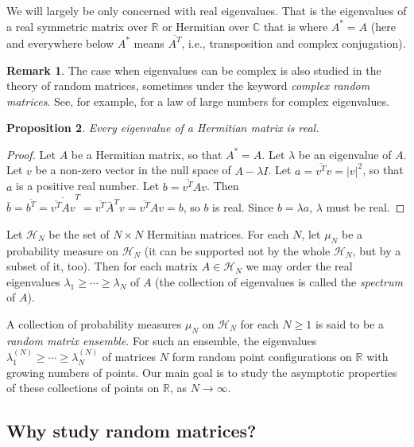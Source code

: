 \documentclass[letterpaper,11pt,oneside,reqno]{amsart}
\numberwithin{equation}{section}
\newtheorem{proposition}{Proposition}[section]
\theoremstyle{definition}
\newtheorem{remark}[proposition]{Remark}
\begin{document}
We will largely be only concerned with real eigenvalues.  That is the
eigenvalues of a real symmetric matrix over $\mathbb R$ or Hermitian over
$\mathbb C$ that is where $A^*=A$
(here and everywhere below
$A^*$ means $\overline{A^{T}}$, i.e., transposition and complex conjugation).

\begin{remark}
	The case when eigenvalues can be complex is also studied in
	the theory of random matrices, sometimes under the keyword \emph{complex
	random matrices}. See, for example, \cite{gotze2010circular} for a law of 
	large numbers for complex eigenvalues.
\end{remark}

\begin{proposition}
Every eigenvalue of a Hermitian matrix is real.
\end{proposition}
\begin{proof}
Let $A$ be a Hermitian matrix, so that $A^*=A$.
Let $\lambda$ be an eigenvalue of $A$.  Let $v$ be a non-zero vector in the null
space of $A-\lambda I$.  Let $a=\overline{ v^{T}}v=|v|^2$, so
that $a$ is a positive real number.  Let $b=\overline{ v^{T}}A
v$.  Then $\bar b=\overline{ b^{T}}=\overline{\overline{
v^{T}}Av}^{T}=\overline{
v^{T}}\bar A^{T} v=\overline{
v^{T}}Av=b$, so $b$ is real.  Since $b=\lambda a$, $\lambda$
must be real. 
\end{proof}

Let $\mathcal H_N$ be the set of $N\times N$ Hermitian matrices.  For each
$N$, let $\mu_N$ be a probability measure on $\mathcal H_N$ (it can be
supported not by  the whole $\mathcal H_N$, but by a subset of it, too).  Then
for each matrix $A\in \mathcal H_N$ we may order the real eigenvalues
$\lambda_1\geq \cdots \geq \lambda_N$ of $A$ (the collection of eigenvalues
is called the \emph{spectrum} of $A$).

A collection of probability measures $\mu_N$ on $\mathcal H_N$ for each
$N\ge1$ is said to be a \emph{random matrix ensemble}. For such an ensemble,
the eigenvalues $\lambda_1^{(N)}\geq \cdots \geq \lambda_N^{(N)}$ of matrices
$N$ form random point configurations on $\mathbb{R}$ with growing numbers of points.
Our main goal is to study the asymptotic properties of these collections of points on $\mathbb{R}$,
as $N\to\infty$.


\subsection{Why study random matrices?} %
\label{sub:why_study_random_matrices_}
\end{document}
